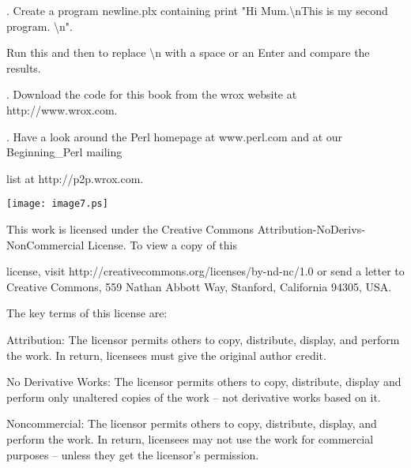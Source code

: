 \documentclass[a4paper,11pt]{book}
\begin{document}
\noindent 

.   Create a program newline.plx containing print "Hi Mum.\textbackslash nThis is my second program. \textbackslash n".

\noindent Run this and then to replace \textbackslash n with a space or an Enter and compare the results.

\noindent 

.   Download the code for this book from the wrox website at http://www.wrox.com.

\noindent 

.   Have a look around the Perl homepage at www.perl.com and at our Beginning\_Perl mailing

\noindent list at http://p2p.wrox.com.

\noindent  

\noindent  

\noindent  

\noindent  

\noindent 

\noindent \texttt{[image: image7.ps]}

\noindent 

\noindent This work is licensed under the Creative Commons Attribution-NoDerivs-NonCommercial License. To view a copy of this

\noindent license, visit http://creativecommons.org/licenses/by-nd-nc/1.0 or send a letter to Creative Commons, 559 Nathan Abbott Way, Stanford, California 94305, USA.

\noindent 

\noindent The key terms of this license are:

\noindent 

\noindent Attribution: The licensor permits others to copy, distribute, display, and perform the work. In return, licensees must give the original author credit.

\noindent 

\noindent No  Derivative  Works: The licensor permits others to copy, distribute, display and perform only unaltered copies of the work -- not derivative works based on it.

\noindent 

\noindent Noncommercial: The licensor permits others to copy, distribute, display, and perform the work. In return, licensees may not use the work for commercial purposes -- unless they get the licensor's permission.
\end{document}
